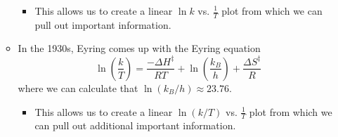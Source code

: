 \documentclass[../notes.tex]{subfiles}
\begin{document}
\begin{itemize}
\begin{itemize}
\begin{itemize}
            \item This allows us to create a linear $\ln k$ vs. $\frac{1}{T}$ plot from which we can pull out important information.
        \end{itemize}
        \item In the 1930s, Eyring comes up with the Eyring equation
        \begin{equation*}
            \ln\left( \frac{k}{T} \right) = \frac{-\Delta H^\ddagger}{RT}+\ln\left( \frac{k_B}{h} \right)+\frac{\Delta S^\ddagger}{R}
        \end{equation*}
        where we can calculate that $\ln(k_B/h)\approx 23.76$.
        \begin{itemize}
            \item This allows us to create a linear $\ln(k/T)$ vs. $\frac{1}{T}$ plot from which we can pull out additional important information.
        \end{itemize}
    \end{itemize}
\end{itemize}
\end{document}
